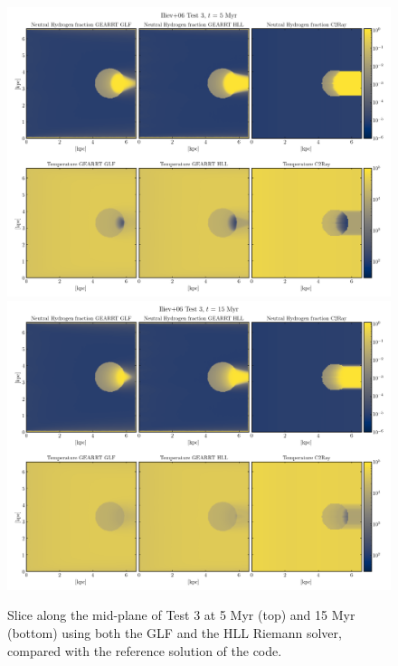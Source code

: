 \begin{figure}
 \centering
 \includegraphics[width=.95\textwidth]{figures/RHD/Iliev3/comparison_128output_0005.png}\\
 \includegraphics[width=.95\textwidth]{figures/RHD/Iliev3/comparison_128output_0015.png}
 \caption{Slice along the mid-plane of Test 3 at 5 Myr (top) and 15 Myr (bottom) using both the GLF
and the HLL Riemann solver, compared with the reference solution of the  code.
}
 \label{fig:iliev3-slices}
\end{figure}


